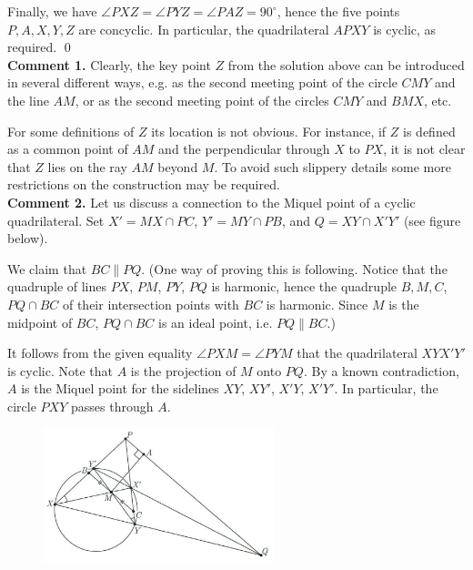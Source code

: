 \documentclass[a4paper, 12pt]{article}
\begin{document}
\begin{enumerate}
Finally, we have $\angle PXZ = \angle PYZ = \angle PAZ = 90^\circ$, hence the five points $P, A, X, Y, Z$ are concyclic. In particular, the quadrilateral $APXY$ is cyclic, as required.  \qed \\



\textbf{Comment 1. }  Clearly, the key point $Z$ from the solution above can be introduced in several different ways, e.g. as the second meeting point of the circle $CMY$ and the line $AM$, or as the second meeting point of the circles $CMY$ and $BMX$, etc.

For some definitions of $Z$ its location is not obvious. For instance, if $Z$ is defined as a common point of $AM$ and the perpendicular through $X$ to $PX$, it is not clear that $Z$ lies on the ray $AM$ beyond $M$. To avoid such slippery details some more restrictions on the construction may be required. \\

\textbf{Comment 2. }  Let us discuss a connection to the Miquel point of a cyclic quadrilateral. Set $X' = MX \cap PC$, $Y' = MY \cap PB$, and $Q = XY \cap X'Y'$ (see figure below).

We claim that $BC \parallel PQ$. (One way of proving this is following. Notice that the quadruple of lines $PX$, $PM$, $PY$, $PQ$ is harmonic, hence the quadruple $B, M, C$, $PQ \cap BC$ of their intersection points with $BC$ is harmonic. Since $M$ is the midpoint of $BC$, $PQ \cap BC$ is an ideal point, i.e. $PQ \parallel BC$.)

It follows from the given equality $\angle PXM = \angle PYM$ that the quadrilateral $XYX'Y'$ is cyclic. Note that $A$ is the projection of $M$ onto $PQ$. By a known contradiction, $A$ is the Miquel point for the sidelines $XY$, $XY'$, $X'Y$, $X'Y'$. In particular, the circle $PXY$ passes through $A$.

\begin{figure}[h]
    \centering
    \includegraphics[width=0.6\textwidth]{2018_G2_2}
\end{figure}


\end{enumerate}
\end{document}
